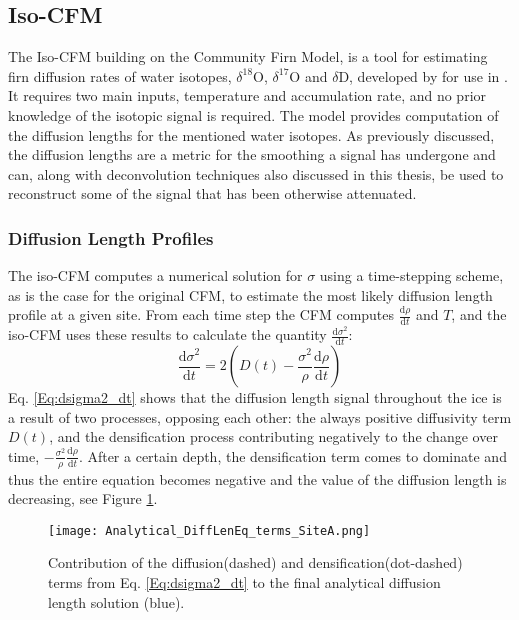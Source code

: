 \documentclass[../../CompleteThesis2/Complete_2ndDraft]{subfiles}
\begin{document}
\subsection[Iso-CFM]{Iso-CFM}
\label{Subsec:Ice_DiffusionAndDensification_IsoCFM}

The Iso-CFM building on the Community Firn Model, is a tool for estimating firn diffusion rates of water isotopes, $\delta^{18}$O, $\delta^{17}$O and $\delta$D, developed by \cite[Gkinis et al., 2021]{Gkinis_2021} for use in \cite{Gkinis_2021}. It requires two main inputs, temperature and accumulation rate, and no prior knowledge of the isotopic signal is required. The model provides computation of the diffusion lengths for the mentioned water isotopes. As previously discussed, the diffusion lengths are a metric for the smoothing a signal has undergone and can, along with deconvolution techniques also discussed in this thesis, be used to reconstruct some of the signal that has been otherwise attenuated.


\subsubsection[Diffusion Length Profiles]{Diffusion Length Profiles}
\label{Subsubsec:Ice_DiffusionAndDensification_IsoCFM_DiffLenProfile}

The iso-CFM computes a numerical solution for $\sigma$ using a time-stepping scheme, as is the case for the original CFM, to estimate the most likely diffusion length profile at a given site. From each time step the CFM computes $\frac{\text{d}\rho}{\text{d}t}$ and $T$, and the iso-CFM uses these results to calculate the quantity $\frac{\text{d}\sigma^2}{\text{d}t}$:
\begin{equation}
	\frac{\text{d}\sigma^2}{\text{d}t} = 2\left(D(t) - \frac{\sigma^2}{\rho}\frac{\text{d}\rho}{\text{d}t}\right)
	\label{Eq:dsigma2_dt}
\end{equation}
Eq. \ref{Eq:dsigma2_dt} shows that the diffusion length signal throughout the ice is a result of two processes, opposing each other: the always positive diffusivity term $D(t)$, and the densification process contributing negatively to the change over time, $-\frac{\sigma^2}{\rho}\frac{\text{d}\rho}{\text{d}t}$. After a certain depth, the densification term comes to dominate and thus the entire equation becomes negative and the value of the diffusion length is decreasing, see Figure \ref{Fig:ICE_DiffDensTerms}.

\begin{figure}
	\centering
	\texttt{[image: Analytical\_DiffLenEq\_terms\_SiteA.png]}
	\caption[Rate terms in the diffusion equation.]{\small Contribution of the diffusion(dashed) and densification(dot-dashed) terms from Eq. \ref{Eq:dsigma2_dt} to the final analytical diffusion length solution (blue).}
	\label{Fig:ICE_DiffDensTerms}
\end{figure}
\end{document}
